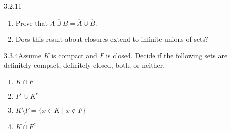 
\begin{exercise}
    {3.2.11} \begin{enumerate}
        \item Prove that \(\overline{A \cup B} = \overline{A} \cup \overline{B}\).
        \item Does this result about closures extend to infinite unions of sets?
    \end{enumerate}
\end{exercise}


\begin{exercise}
    {3.3.4}Assume \(K\) is compact and \(F\) is closed. Decide if the following sets are definitely compact, definitely closed, both, or neither. 
    \begin{enumerate}
        \item \(K \cap F\)
        \item \(\overline{F^c \cup K^c}\)
        \item \(K \setminus F = \{x \in K \mid x \notin F\}\)
        \item \(\overline{K \cap F^c}\)
    \end{enumerate}
\end{exercise}